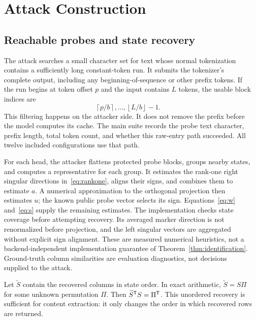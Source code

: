 \section{Attack Construction}
\label{sec:attack}
\subsection{Reachable probes and state recovery}
The attack searches a small character set for text whose normal tokenization contains a sufficiently long constant-token run. It submits the tokenizer's complete output, including any beginning-of-sequence or other prefix tokens. If the run begins at token offset $p$ and the input contains $L$ tokens, the usable block indices are
\begin{equation}
 \left\lceil p/b\right\rceil,\ldots,\left\lfloor L/b\right\rfloor-1.
\end{equation}
This filtering happens on the attacker side. It does not remove the prefix before the model computes its cache. The main suite records the probe text character, prefix length, total token count, and whether this raw-entry path succeeded. All twelve included configurations use that path.

For each head, the attacker flattens protected probe blocks, groups nearby states, and computes a representative for each group. It estimates the rank-one right singular directions in~\eqref{eq:rankone}, aligns their signs, and combines them to estimate $a$. A numerical approximation to the orthogonal projection then estimates $u$; the known public probe vector selects its sign. Equations~\eqref{eq:w} and~\eqref{eq:s} supply the remaining estimates. The implementation checks state coverage before attempting recovery. Its averaged marker direction is not renormalized before projection, and the left singular vectors are aggregated without explicit sign alignment. These are measured numerical heuristics, not a backend-independent implementation guarantee of Theorem~\ref{thm:identification}. Ground-truth column similarities are evaluation diagnostics, not decisions supplied to the attack.

Let $\widetilde S$ contain the recovered columns in state order. In exact arithmetic, $\widetilde S=S\Pi$ for some unknown permutation $\Pi$. Then $\widetilde S^{\mathsf{T}} S=\Pi^{\mathsf{T}}$. This unordered recovery is sufficient for content extraction: it only changes the order in which recovered rows are returned.

